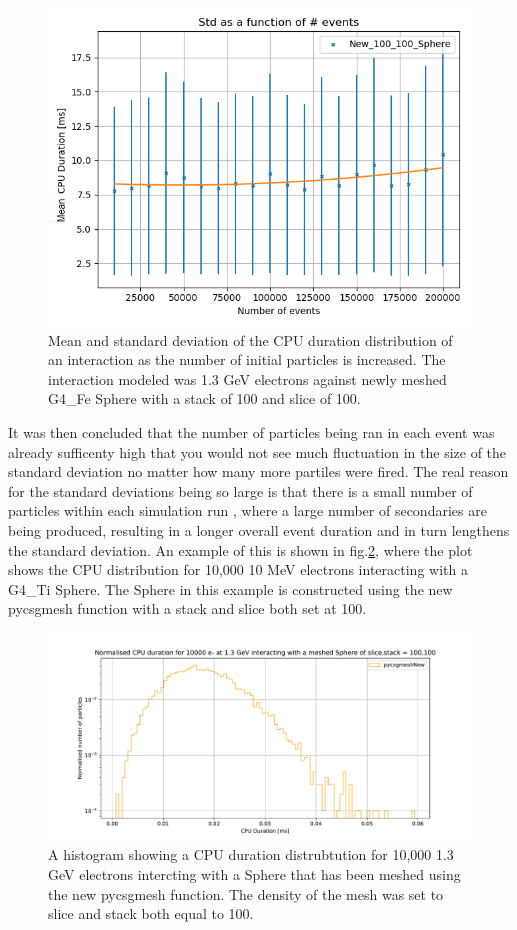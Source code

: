 \documentclass[12pt,a4paper]{article}
\begin{document}
\begin{figure}[h!]
\centering
\includegraphics[scale=0.6]{Images//Error//std_N1.png}
\caption[width=\columnwidth]{Mean and standard deviation of the CPU duration distribution of an interaction as the number of initial particles is increased. The interaction modeled was 1.3 GeV electrons against  newly meshed G4\_Fe Sphere with a stack of 100 and slice of 100.}
\label{err}
\end{figure}

\noindent It was then concluded that the number of particles being ran in each event was already sufficenty high that you would not see much fluctuation in the size of the standard deviation no matter how many more partiles were fired. The real reason for the standard deviations being so large is that there is a small number of particles within each simulation run , where a large number of secondaries are being produced, resulting in a longer overall event duration and in turn lengthens the standard deviation. An example of this is shown in fig.\ref{disty}, where the plot shows the CPU distribution for 10,000 10 MeV electrons interacting with a G4\_Ti Sphere. The Sphere in this example is constructed using the new pycsgmesh function with a stack and slice both set at 100.

\begin{figure}[h!]
\centering
\includegraphics[scale=0.5]{Images//CPU//pythonhist1.pdf}
\caption[width=\columnwidth]{A  histogram showing a CPU duration distrubtution for 10,000 1.3 GeV electrons intercting with a Sphere that has been meshed using the new pycsgmesh function. The density of the mesh was set to slice and stack both equal to 100.}
\label{disty}
\end{figure}
\end{document}
